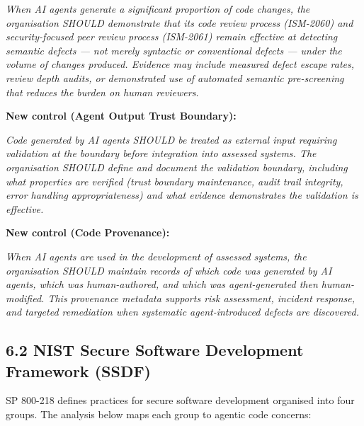 \documentclass[a4paper,11pt]{report}
\renewenvironment{quote}{%
  \par\medskip\noindent
  \hspace{0.5cm}\begin{minipage}{\dimexpr\textwidth-1cm}
  \itshape\color{dtabody}
}{%
  \end{minipage}\par\medskip
}
\begin{document}
\begin{quote}
\emph{When AI agents generate a significant proportion of code changes,
the organisation SHOULD demonstrate that its code review process
(ISM-2060) and security-focused peer review process (ISM-2061) remain
effective at detecting semantic defects --- not merely syntactic or
conventional defects --- under the volume of changes produced. Evidence
may include measured defect escape rates, review depth audits, or
demonstrated use of automated semantic pre-screening that reduces the
burden on human reviewers.}
\end{quote}

\textbf{New control (Agent Output Trust Boundary):}

\begin{quote}
\emph{Code generated by AI agents SHOULD be treated as external input
requiring validation at the boundary before integration into assessed
systems. The organisation SHOULD define and document the validation
boundary, including what properties are verified (trust boundary
maintenance, audit trail integrity, error handling appropriateness) and
what evidence demonstrates the validation is effective.}
\end{quote}

\textbf{New control (Code Provenance):}

\begin{quote}
\emph{When AI agents are used in the development of assessed systems,
the organisation SHOULD maintain records of which code was generated by
AI agents, which was human-authored, and which was agent-generated then
human-modified. This provenance metadata supports risk assessment,
incident response, and targeted remediation when systematic
agent-introduced defects are discovered.}
\end{quote}

\hypertarget{nist-secure-software-development-framework-ssdf}{%
\subsection{6.2 NIST Secure Software Development Framework
(SSDF)}\label{nist-secure-software-development-framework-ssdf}}

SP 800-218 defines practices for secure software development organised
into four groups. The analysis below maps each group to agentic code
concerns:
\end{document}
